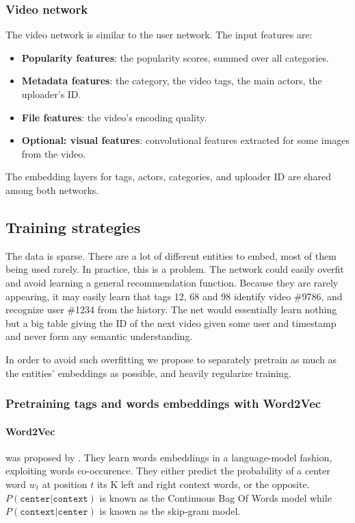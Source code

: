 \subsubsection{Video network}

The video network is similar to the user network. The input features are:

\begin{itemize}
    \item \textbf{Popularity features}: the popularity scores, summed over all categories.
    \item \textbf{Metadata features}: the category, the video tags, the main actors, the uploader's ID.
    \item \textbf{File features}: the video's encoding quality.
    \item \textbf{Optional: visual features}: convolutional features extracted for some images from the video.
\end{itemize}

The embedding layers for tags, actors, categories, and uploader ID are shared among both networks.

\subsection{Training strategies}

The data is sparse. There are a lot of different entities to embed, most of them being used rarely. In practice, this is a problem. The network could easily overfit and avoid learning a general recommendation function. Because they are rarely appearing, it may easily learn that tags 12, 68 and 98 identify video \#9786, and recognize user \#1234 from the history. The net would essentially learn nothing but a big table giving the ID of the next video given some user and timestamp and never form any semantic understanding.

In order to avoid such overfitting we propose to separately pretrain as much as the entities' embeddings as possible, and heavily regularize training.

\subsubsection{Pretraining tags and words embeddings with Word2Vec}


\paragraph{Word2Vec} was proposed by \citet{word2vec}. They learn words embeddings in a language-model fashion, exploiting words co-occurence. They either predict the probability of a center word $w_t$ at position $t$ its K left and right context words, or the opposite. $P(\texttt{center} | \texttt{context})$ is known as the Continuous Bag Of Words model while $P(\texttt{context}|\texttt{center})$ is known as the skip-gram model.

